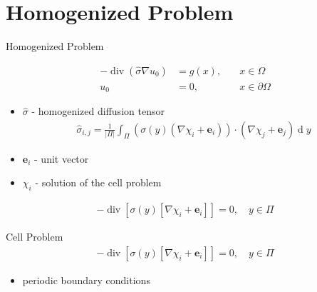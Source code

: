 \documentclass[10pt]{beamer}	%
\begin{document}
\section{Homogenized Problem}
\begin{frame}{Homogenized Problem}

\begin{align*}
-\operatorname{div} (\hat \sigma \nabla u_0) &= g(x), \quad &x \in \Omega \\
u_0 &=0, \quad &x \in \partial \Omega
\end{align*}
\begin{itemize}
\item $\hat \sigma $ - homogenized diffusion tensor
\begin{align*}
\hat \sigma_{i,j} = \frac{1}{|\Pi|} \int_{\Pi} (\sigma(y)(\nabla \chi_i + \boldsymbol e_i)) \cdot (\nabla \chi_j + \boldsymbol e_j) \operatorname d y
\end{align*}
\item $\boldsymbol e_i$ - unit vector
\item $\chi_i$ - solution of the cell problem
\end{itemize}
\begin{align*}
- \operatorname{div} \left[ \sigma(y)[\nabla \chi_i + \boldsymbol e_i ]\right] = 0 , \quad y \in \Pi
\end{align*}
\end{frame}
\begin{frame}{Cell Problem}
\begin{align*}
- \operatorname{div} \left[ \sigma(y)[\nabla \chi_i + \boldsymbol e_i ]\right] = 0 , \quad y \in \Pi
\end{align*}
\begin{figure}
\end{figure}
\begin{itemize}
\item periodic boundary conditions
\end{itemize}
\end{frame}
\end{document}
